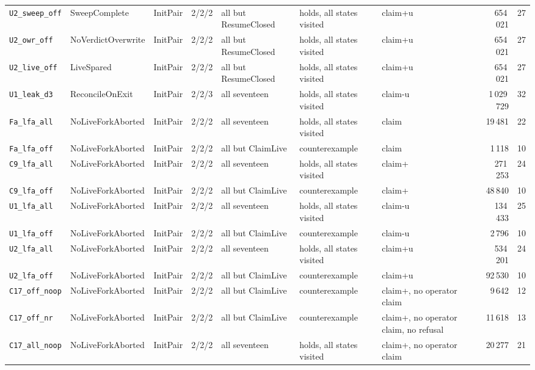 \documentclass[a4paper,10pt,fleqn]{article}
\begin{document}
{\begin{center}
\begin{tabularx}{\textwidth}{@{}l l l l X X l r r@{}}
\texttt{U2\_sweep\_off} & SweepComplete & InitPair & 2/2/2 & all but ResumeClosed & holds, all states visited & claim+u & 654\,021 & 27 \\
\texttt{U2\_owr\_off} & NoVerdictOverwrite & InitPair & 2/2/2 & all but ResumeClosed & holds, all states visited & claim+u & 654\,021 & 27 \\
\texttt{U2\_live\_off} & LiveSpared & InitPair & 2/2/2 & all but ResumeClosed & holds, all states visited & claim+u & 654\,021 & 27 \\
\texttt{U1\_leak\_d3} & ReconcileOnExit & InitPair & 2/2/3 & all seventeen & holds, all states visited & claim-u & 1\,029\,729 & 32 \\
\texttt{Fa\_lfa\_all} & NoLiveForkAborted & InitPair & 2/2/2 & all seventeen & holds, all states visited & claim & 19\,481 & 22 \\
\texttt{Fa\_lfa\_off} & NoLiveForkAborted & InitPair & 2/2/2 & all but ClaimLive & counterexample & claim & 1\,118 & 10 \\
\texttt{C9\_lfa\_all} & NoLiveForkAborted & InitPair & 2/2/2 & all seventeen & holds, all states visited & claim+ & 271\,253 & 24 \\
\texttt{C9\_lfa\_off} & NoLiveForkAborted & InitPair & 2/2/2 & all but ClaimLive & counterexample & claim+ & 48\,840 & 10 \\
\texttt{U1\_lfa\_all} & NoLiveForkAborted & InitPair & 2/2/2 & all seventeen & holds, all states visited & claim-u & 134\,433 & 25 \\
\texttt{U1\_lfa\_off} & NoLiveForkAborted & InitPair & 2/2/2 & all but ClaimLive & counterexample & claim-u & 2\,796 & 10 \\
\texttt{U2\_lfa\_all} & NoLiveForkAborted & InitPair & 2/2/2 & all seventeen & holds, all states visited & claim+u & 534\,201 & 24 \\
\texttt{U2\_lfa\_off} & NoLiveForkAborted & InitPair & 2/2/2 & all but ClaimLive & counterexample & claim+u & 92\,530 & 10 \\
\texttt{C17\_off\_noop} & NoLiveForkAborted & InitPair & 2/2/2 & all but ClaimLive & counterexample & claim+, no operator claim & 9\,642 & 12 \\
\texttt{C17\_off\_nr} & NoLiveForkAborted & InitPair & 2/2/2 & all but ClaimLive & counterexample & claim+, no operator claim, no refusal & 11\,618 & 13 \\
\texttt{C17\_all\_noop} & NoLiveForkAborted & InitPair & 2/2/2 & all seventeen & holds, all states visited & claim+, no operator claim & 20\,277 & 21 \\

\end{tabularx}
\end{center}}
\end{document}
